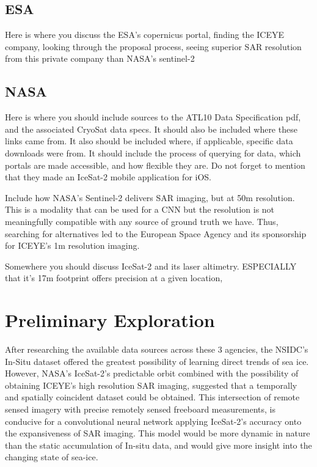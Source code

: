 \subsection*{ESA}
Here is where you discuss the ESA's copernicus portal, finding the ICEYE company, looking through the proposal process, seeing superior SAR resolution from this private company than NASA's sentinel-2

\subsection*{NASA}
Here is where you should include sources to the ATL10 Data Specification pdf, and the associated CryoSat data specs. It should also be included where these links came from. It also should be included where, if applicable, specific data downloads were from. It should include the process of querying for data, which portals are made accessible, and how flexible they are. Do not forget to mention that they made an IceSat-2 mobile application for iOS.

Include how NASA's Sentinel-2 delivers SAR imaging, but at 50m resolution. This is a modality that can be used for a CNN but the resolution is not meaningfully compatible with any source of ground truth we have. Thus, searching for alternatives led to the European Space Agency and its sponsorship for ICEYE's 1m resolution imaging.

Somewhere you should discuss IceSat-2 and its laser altimetry. ESPECIALLY that it's 17m footprint offers precision at a given location, 

\section {Preliminary Exploration}
After researching the available data sources across these 3 agencies, the NSIDC's In-Situ dataset offered the greatest possibility of learning direct trends of sea ice. However, NASA's IceSat-2's predictable orbit combined with the possibility of obtaining ICEYE's high resolution SAR imaging, suggested that a temporally and spatially coincident dataset could be obtained. This intersection of remote sensed imagery with precise remotely sensed freeboard measurements, is conducive for a convolutional neural network applying IceSat-2's accuracy onto the expansiveness of SAR imaging. This model would be more dynamic in nature than the static accumulation of In-situ data, and would give more insight into the changing state of sea-ice.

